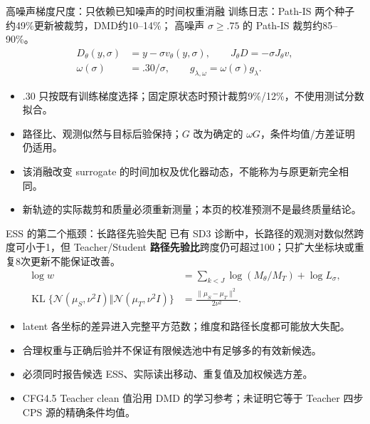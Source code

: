 \documentclass[10pt,aspectratio=169]{beamer}
\newcommand{\N}{\mathcal N}
\newcommand{\KL}{\operatorname{KL}}
\begin{document}
\begin{frame}{高噪声梯度尺度：只依赖已知噪声的时间权重消融}
\small
训练日志：Path-IS 两个种子约49\%更新被裁剪，DMD约10--14\%；
高噪声 $\sigma\geq.75$ 的 Path-IS 裁剪约85--90\%。
\begin{align}
D_\theta(y,\sigma)&=y-\sigma v_\theta(y,\sigma),\qquad J_\theta D=-\sigma J_\theta v,\\
\omega(\sigma)&=.30/\sigma,\qquad g_{\lambda,\omega}=\omega(\sigma)g_\lambda.
\end{align}
\begin{itemize}\itemsep4pt
\item $.30$ 只按既有训练梯度选择；固定原状态时预计裁剪9\%/12\%，不使用测试分数拟合。
\item 路径比、观测似然与目标后验保持；$G$ 改为确定的 $\omega G$，条件均值/方差证明仍适用。
\item 该消融改变 surrogate 的时间加权及优化器动态，不能称为与原更新完全相同。
\item 新轨迹的实际裁剪和质量必须重新测量；本页的校准预测不是最终质量结论。
\end{itemize}
\end{frame}
\begin{frame}{ESS 的第二个瓶颈：长路径先验失配}
\small
已有 SD3 诊断中，长路径的观测对数似然跨度可小于1，但 Teacher/Student
\textbf{路径先验比}跨度仍可超过100；只扩大坐标块或重复8次更新不能保证改善。
\begin{align}
\log w&=\sum_{k<J}\log(M_\theta/M_T)+\log L_\sigma,\\
\KL\{\N(\mu_S,\nu^2I)\Vert\N(\mu_T,\nu^2I)\}
&=\frac{\|\mu_S-\mu_T\|^2}{2\nu^2}.
\end{align}
\begin{itemize}\itemsep5pt
\item latent 各坐标的差异进入完整平方范数；维度和路径长度都可能放大失配。
\item 合理权重与正确后验并不保证有限候选池中有足够多的有效新候选。
\item 必须同时报告候选 ESS、实际读出移动、重复值及加权候选方差。
\item CFG4.5 Teacher clean 值沿用 DMD 的学习参考；未证明它等于 Teacher 四步 CPS 源的精确条件均值。
\end{itemize}
\end{frame}
\end{document}
